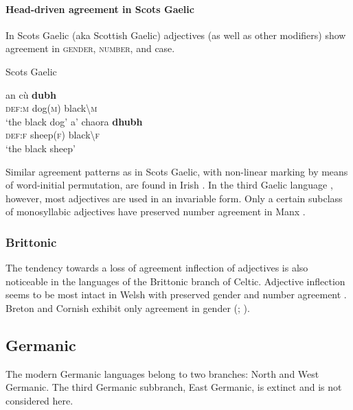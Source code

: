 \paragraph{Head-driven agreement in Scots Gaelic} 
In Scots Gaelic (aka Scottish Gaelic) adjectives (as well as other modifiers) show agreement in \textsc{gender, number}, and {\sc case}.
\begin{exe}
\ex \rm{Scots Gaelic \citep[201]{macauley1992}}
\begin{xlist}
\ex
\gll	an cù \textbf{dubh}\\
	\textsc{def:m} dog(\textsc{m}) black\textbackslash\textsc{m}\\
\glt	‘the black dog’
\ex
\gll	a' chaora \textbf{dhubh}\\
	\textsc{def:f} sheep(\textsc{f}) black\textbackslash\textsc{f}\\
\glt	‘the black sheep’
\end{xlist}
\end{exe}
Similar agreement patterns as in Scots Gaelic, with non-linear marking by means of word-initial permutation, are found in Irish \cite[73, 97]{odochartaigh1992}. In the third Gaelic language , however, most adjectives are used in an invariable form. Only a certain subclass of monosyllabic adjectives have preserved number agreement in Manx \cite[127]{thomsen1992}.

\subsubsection{Brittonic}
The tendency towards a loss of agreement inflection of adjectives is also noticeable in the languages of the Brittonic branch of Celtic. Adjective inflection seems to be most intact in Welsh with preserved gender and number agreement \cite[298–299]{thomas1992a}. Breton and Cornish exhibit only agreement in gender (\citealt[405]{ternes1992}; \citealt[355]{thomas1992b}).

\subsection{Germanic}
The modern Germanic languages belong to two branches: North and West Germanic. The third Germanic subbranch, East Germanic, is extinct and is not considered here.

